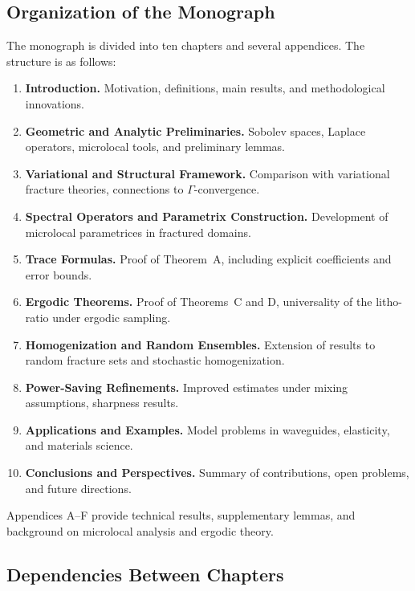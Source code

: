 \subsection{Organization of the Monograph}

The monograph is divided into ten chapters and several appendices. The structure
is as follows:

\begin{enumerate}[label=Chapter~\arabic*:]
  \item \textbf{Introduction.} Motivation, definitions, main results, and
  methodological innovations.
  \item \textbf{Geometric and Analytic Preliminaries.} Sobolev spaces, Laplace
  operators, microlocal tools, and preliminary lemmas.
  \item \textbf{Variational and Structural Framework.} Comparison with
  variational fracture theories, connections to $\Gamma$-convergence.
  \item \textbf{Spectral Operators and Parametrix Construction.} Development of
  microlocal parametrices in fractured domains.
  \item \textbf{Trace Formulas.} Proof of Theorem~A, including explicit
  coefficients and error bounds.
  \item \textbf{Ergodic Theorems.} Proof of Theorems~C and D, universality of
  the litho-ratio under ergodic sampling.
  \item \textbf{Homogenization and Random Ensembles.} Extension of results to
  random fracture sets and stochastic homogenization.
  \item \textbf{Power-Saving Refinements.} Improved estimates under mixing
  assumptions, sharpness results.
  \item \textbf{Applications and Examples.} Model problems in waveguides,
  elasticity, and materials science.
  \item \textbf{Conclusions and Perspectives.} Summary of contributions, open
  problems, and future directions.
\end{enumerate}

Appendices A–F provide technical results, supplementary lemmas, and background
on microlocal analysis and ergodic theory.

\subsection{Dependencies Between Chapters}

